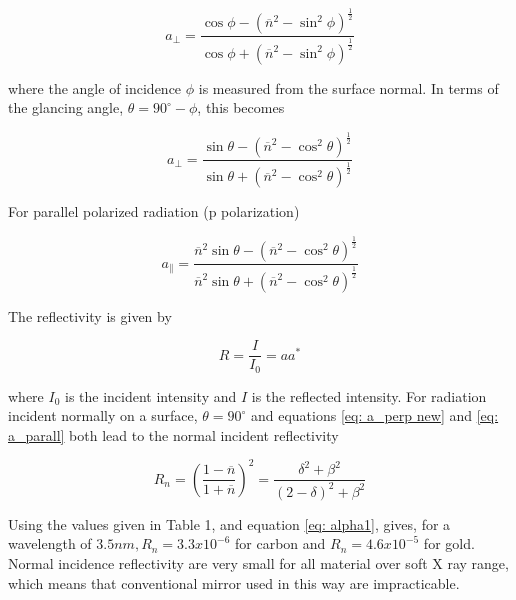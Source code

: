 \begin{equation}
	a_{\perp} = \frac{\cos \phi - (\overline{n}^2 - \sin^2 \phi)^{\frac{1}{2}}}{\cos \phi + (\overline{n}^2 - \sin^2 \phi)^{\frac{1}{2}}}
	\label{eq: a_perp}
\end{equation}

\begin{flushleft}
where the angle of incidence $\phi $ is measured from the surface normal. In terms of the glancing angle, $\theta = 90 ^{\circ} - \phi$, this becomes
\end{flushleft}

\begin{equation}
	a_{\perp} = \frac{\sin \theta - (\overline{n}^2 - \cos^2 \theta)^{\frac{1}{2}}}{\sin \theta + (\overline{n}^2 - \cos^2 \theta)^{\frac{1}{2}}}
	\label{eq: a_perp new}
\end{equation}

\begin{flushleft}
For parallel polarized radiation (p polarization)
\end{flushleft}


\begin{equation}
	a_{\parallel} = \frac{\overline{n}^2 \sin \theta - (\overline{n}^2 - \cos^2 \theta)^{\frac{1}{2}}}{\overline{n}^2 \sin \theta + (\overline{n}^2 - \cos ^2 \theta)^{\frac{1}{2}}}
	\label{eq: a_parall}
\end{equation}

\begin{flushleft}
The reflectivity is given by
\end{flushleft}

\begin{equation}
	R = \frac{I}{I_0}= aa^{*}
	\label{eq: R}
\end{equation}

\begin{flushleft}
where $I_0 $ is the incident intensity and $I $ is the reflected intensity. For radiation incident normally on a surface, $\theta = 90^{\circ} $ and equations \ref{eq: a_perp new} and \ref{eq: a_parall} both lead to the normal incident reflectivity
\end{flushleft}

\begin{equation}
	R_n = \left( \frac{1 - \overline{n}}{1 + \overline{n}} \right)^2 = \frac{\delta^2 + \beta^2}{(2 - \delta)^2 + \beta^2}
	\label{eq: Rn}
\end{equation}

\begin{flushleft}
Using the values given in Table 1, and equation \ref{eq: alpha1}, gives, for a wavelength of $3.5 nm, R_n=3.3x10^{-6} $ for carbon and $R_n=4.6x10^{-5} $ for gold. Normal incidence reflectivity are very small for all material over soft X ray range, which means that conventional mirror used in this way are impracticable. 
\end{flushleft}  

